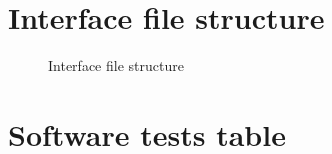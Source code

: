 \documentclass{article}
\begin{document}
\section{Interface file structure} \label{sec:appendix-interface-struct}
\begin{figure}[!htb]
	\caption{\label{fig:interface-struct1} Interface file structure}
\end{figure}


\section{Software tests table}\label{sec:appendix-software-tests}
\end{document}
